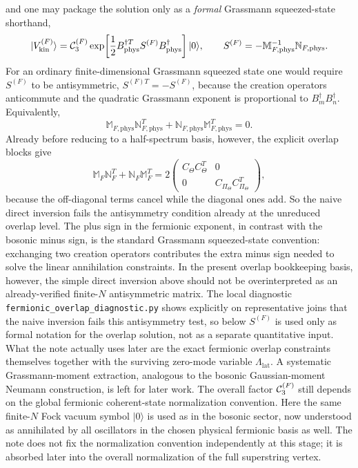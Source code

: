 \documentclass[11pt]{article}
\numberwithin{equation}{section}
\begin{document}
and one may package the solution only as a \emph{formal} Grassmann squeezed-state shorthand,
\begin{equation}
\label{eq:s13-011}
|V^{(F)}_{\mathrm{kin}}\rangle
=
{\cal C}_3^{(F)}
\exp\!\left[
\frac12 B_{\mathrm{phys}}^{\dagger T}S^{(F)} B_{\mathrm{phys}}^\dagger
\right]|0\rangle,
\qquad
S^{(F)} = -\mathbb M_{F,\mathrm{phys}}^{-1}\mathbb N_{F,\mathrm{phys}}.
\end{equation}
For an ordinary finite-dimensional Grassmann squeezed state one would require $S^{(F)}$ to be antisymmetric, $S^{(F)T}=-S^{(F)}$, because the creation operators anticommute and the quadratic Grassmann exponent is proportional to $B_m^\dagger B_n^\dagger$.
Equivalently,
\begin{equation}
\label{eq:s13-011a}
\mathbb M_{F,\mathrm{phys}}\mathbb N_{F,\mathrm{phys}}^T
+\mathbb N_{F,\mathrm{phys}}\mathbb M_{F,\mathrm{phys}}^T
=0.
\end{equation}
Already before reducing to a half-spectrum basis, however, the explicit overlap blocks give
\begin{equation}
\label{eq:s13-011b}
\mathbb M_F\mathbb N_F^T+\mathbb N_F\mathbb M_F^T
=
2
\begin{pmatrix}
C_\Theta C_\Theta^T & 0\\
0 & C_{\Pi_\Theta}C_{\Pi_\Theta}^T
\end{pmatrix},
\end{equation}
because the off-diagonal terms cancel while the diagonal ones add. So the naive direct inversion fails the antisymmetry condition already at the unreduced overlap level.
The plus sign in the fermionic exponent, in contrast with the bosonic minus sign, is the standard Grassmann squeezed-state convention: exchanging two creation operators contributes the extra minus sign needed to solve the linear annihilation constraints.
In the present overlap bookkeeping basis, however, the simple direct inversion above should not be overinterpreted as an already-verified finite-$N$ antisymmetric matrix. The local diagnostic \texttt{fermionic\_overlap\_diagnostic.py} shows explicitly on representative joins that the naive inversion fails this antisymmetry test, so below $S^{(F)}$ is used only as formal notation for the overlap solution, not as a separate quantitative input. What the note actually uses later are the exact fermionic overlap constraints themselves together with the surviving zero-mode variable $\Lambda_{\mathrm{lat}}$. A systematic Grassmann-moment extraction, analogous to the bosonic Gaussian-moment Neumann construction, is left for later work. The overall factor ${\cal C}_3^{(F)}$ still depends on the global fermionic coherent-state normalization convention. Here the same finite-$N$ Fock vacuum symbol $|0\rangle$ is used as in the bosonic sector, now understood as annihilated by all oscillators in the chosen physical fermionic basis as well. The note does not fix the normalization convention independently at this stage; it is absorbed later into the overall normalization of the full superstring vertex.
\end{document}
